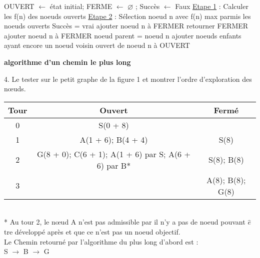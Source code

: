 \documentclass[12pt,a4paper, france]{article}
\newcommand\tab[1][1cm]{\hspace*{#1}}
\begin{document}
\begin{algorithm}[ht!]
\dontprintsemicolon
OUVERT ${\leftarrow}$ {état initial}; FERME ${\leftarrow}$ ${\varnothing}$ ; Succès ${\leftarrow}$ Faux\;
 {
    \underline{Etape 1} :  Calculer les f(n) des noeuds ouverts\;
    \underline{Etape 2} :  S\'election noeud n avec f(n) max parmis les noeuds ouverts \;
          {
        \hspace{1cm}        Succ\`es = vrai \;
        \hspace{1cm}        ajouter noeud n à FERMER \;
        \hspace{1cm}        retourner FERMER \;
        }
        {
        \hspace{1cm}        ajouter noeud n à FERMER \;
        \hspace{1cm}        noeud parent = noeud n \;
        \hspace{1cm}        ajouter noeuds enfants ayant encore un noeud voisin ouvert de noeud n à OUVERT \;
        }
}
\caption{{\bf algorithme d\textquoteright un chemin le plus long}
}
\label{algo:elim:cand}
\end{algorithm}

\tab 4. Le tester sur le petit graphe de la figure 1 et montrer l\textquoteright ordre d\textquoteright exploration des nœuds. \\

\begin{tabular}{ | c || *{2}{c|}}
    \hline
    Tour & Ouvert & Ferm\'e  \\
    \hline
    \hline
    0 & S(0 + 8) & \\
    \hline
    1 & A(1 + 6); B(4 + 4) & S(8)\\
    \hline
    2 & G(8 + 0); C(6 + 1); A(1 + 6) par S; A(6 + 6) par B* & S(8); B(8)\\
    \hline
    3 & & A(8); B(8); G(8) \\
    \hline
\end{tabular} \\
* Au tour 2, le nœud A n\textquoteright est pas admissible par il n\textquoteright y a pas de noeud pouvant ${\hat{e}}$tre d\'evelopp\'e apr\`es et que ce n\textquoteright est pas un noeud objectif.\\

Le Chemin retourn\'e par l\textquoteright algorithme du plus long d\textquoteright abord est : \\
\tab \tab \tab S ${\rightarrow}$ B ${\rightarrow}$ G\\
\end{document}
